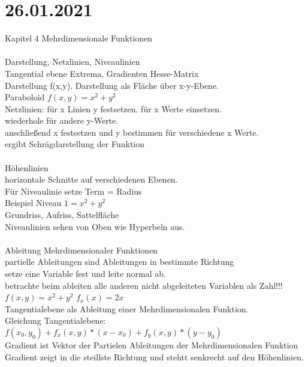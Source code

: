 \documentclass{article}
\begin{document}
	 \section*{26.01.2021}
	 Kapitel 4 Mehrdimensionale Funktionen \\ \\
	 Darstellung, Netzlinien, Niveaulinien \\
	 Tangential ebene Extrema, Gradienten Hesse-Matrix \\
	 Darstellung f(x,y). Darstellung als Fläche über x-y-Ebene. \\
	 Paraboloid $f(x,y) = x^2 + y^2$ \\
	 Netzlinien: für x Linien y festsetzen. für x Werte einsetzen. \\
	 wiederhole für andere y-Werte. \\
	 anschließend x festsetzen und y bestimmen für verschiedene x Werte. \\
	 ergibt Schrägdarstellung der Funktion \\
	 \\
	 Höhenlinien \\
	 horizontale Schnitte auf verschiedenen Ebenen. \\
	 Für Niveaulinie setze Term = Radius \\
	 Beispiel Niveau $1 = x^2 + y^2$ \\
	 Grundriss, Aufriss, Sattelfläche \\
	 Niveaulinien sehen von Oben wie Hyperbeln aus. \\
	 \\
	 Ableitung Mehrdimensionaler Funktionen \\
	 partielle Ableitungen sind Ableitungen in bestimmte Richtung \\
	 setze eine Variable fest und leite normal ab. \\
	 betrachte beim ableiten alle anderen nicht abgeleiteten Variablen als Zahl!!! \\
	 $f(x,y) = x^2 + y^2$ $f_x(x) = 2x$ \\
	 Tangentialebene als Ableitung einer Mehrdimensionalen Funktion. \\
	 Gleichung Tangentialebene: $f(x_0,y_0) + f_x(x,y) * (x-x_0) + f_y(x,y) * (y - y_0)$ \\
	 Gradient ist Vektor der Partielen Ableitungen der Mehrdimensionalen Funktion \\
	 Gradient zeigt in die steillste Richtung und stehtt senkrecht auf den Höhenlinien. \\
\end{document}

